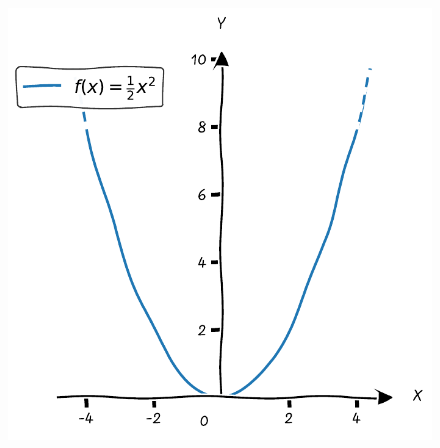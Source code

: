 \documentclass{tufte-handout}
\begin{document}
\begin{figure}[h]
\begin{minipage}{0.22\textwidth}
    \label{fig:first}
  \end{minipage}\hfill
  \begin{minipage}{0.30\textwidth}
    \includegraphics[width=\linewidth]{./graphs/quadratic_func_shrink_2.pdf}
    \label{fig:second}
  \end{minipage}\hfill
  \begin{minipage}{0.21\textwidth}

\end{minipage}
\end{figure}
\end{document}
